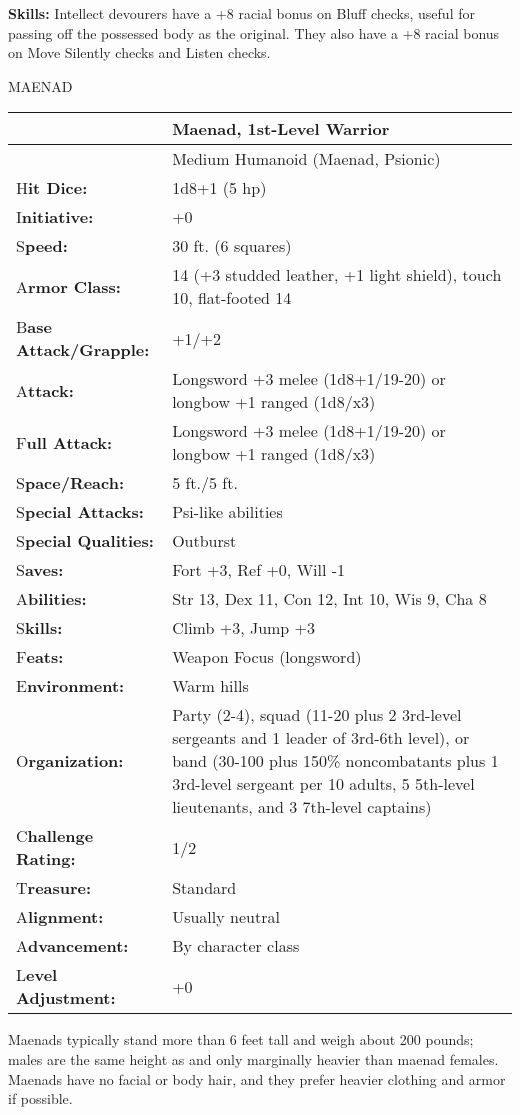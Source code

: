 \documentclass{article}
\begin{document}
\textbf{Skills: }Intellect devourers have a +8 racial bonus on Bluff checks, useful 
for passing off the possessed body as the original. They also have a +8 racial 
bonus on Move Silently checks and Listen checks.

\vspace{12pt}
{\LARGE{}MAENAD}

\begin{tabular}{|>{\raggedright}p{84pt}|>{\raggedright}p{241pt}|}
\hline
  & Maenad, 1st-Level Warrior\tabularnewline
\hline
  & Medium Humanoid (Maenad, Psionic)\tabularnewline
\hline
H\textbf{it Dice:} & 1d8+1 (5 hp)\tabularnewline
\hline
I\textbf{nitiative:} & +0\tabularnewline
\hline
S\textbf{peed:} & 30 ft. (6 squares)\tabularnewline
\hline
A\textbf{rmor Class:} & 14 (+3 studded leather, +1 light shield), touch 10, flat-footed 
14\tabularnewline
\hline
B\textbf{ase Attack/Grapple:} & +1/+2\tabularnewline
\hline
A\textbf{ttack:} & Longsword +3 melee (1d8+1/19-20) or longbow +1 ranged (1d8/x3)\tabularnewline
\hline
F\textbf{ull Attack:} & Longsword +3 melee (1d8+1/19-20) or longbow +1 ranged (1d8/x3)\tabularnewline
\hline
S\textbf{pace/Reach:} & 5 ft./5 ft.\tabularnewline
\hline
S\textbf{pecial Attacks:} & Psi-like abilities\tabularnewline
\hline
S\textbf{pecial Qualities:} & Outburst\tabularnewline
\hline
S\textbf{aves:} & Fort +3, Ref +0, Will -1 \tabularnewline
\hline
A\textbf{bilities:} & Str 13, Dex 11, Con 12, Int 10, Wis 9, Cha 8\tabularnewline
\hline
S\textbf{kills:} & Climb +3, Jump +3\tabularnewline
\hline
F\textbf{eats:} & Weapon Focus (longsword)\tabularnewline
\hline
E\textbf{nvironment:} & Warm hills\tabularnewline
\hline
O\textbf{rganization:} & Party (2-4), squad (11-20 plus 2 3rd-level sergeants and 
1 leader of 3rd-6th level), or band (30-100 plus 150\% noncombatants plus 1 3rd-level 
sergeant per 10 adults, 5 5th-level lieutenants, and 3 7th-level captains)\tabularnewline
\hline
C\textbf{hallenge Rating:} & 1/2\tabularnewline
\hline
T\textbf{reasure:} & Standard\tabularnewline
\hline
A\textbf{lignment:} & Usually neutral\tabularnewline
\hline
A\textbf{dvancement:} & By character class\tabularnewline
\hline
L\textbf{evel Adjustment:} & +0\tabularnewline
\hline
\end{tabular}

Maenads typically stand more than 6 feet tall and weigh about 200 pounds; males 
are the same height as and only marginally heavier than maenad females. Maenads 
have no facial or body hair, and they prefer heavier clothing and armor if possible.
\end{document}
